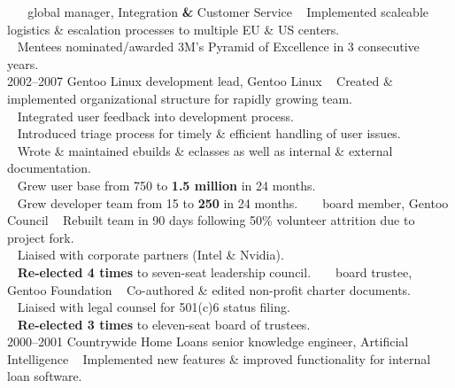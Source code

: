\documentclass[]{friggeri-cv} %
\begin{document}
\begin{entrylist}
\entry
{~}
{~}
{global manager, Integration \textbf{\&} Customer Service}
{{\tiny {}} ~ Implemented scaleable logistics \& escalation processes to multiple EU \& US centers.\\
{\tiny {}} ~ Mentees nominated/awarded 3M's Pyramid of Excellence in 3 consecutive years.\\}
\entry
{2002--2007}
{Gentoo Linux}
{development lead, Gentoo Linux}
{{\tiny {}} ~ Created \& implemented organizational structure for rapidly growing team.\\
{\tiny {}} ~ Integrated user feedback into development process.\\
{\tiny {}} ~ Introduced triage process for timely \& efficient handling of user issues.\\

{\tiny {}} ~ Wrote \& maintained ebuilds \& eclasses as well as internal \& external documentation.\\
{\tiny {}} ~ Grew user base from 750 to \textbf{1.5 million} in 24 months.\\
{\tiny {}} ~ Grew developer team from 15 to \textbf{250} in 24 months.}
\entry
{~}
{~}
{board member, Gentoo Council}
{{\tiny {}} ~ Rebuilt team in 90 days following 50\% volunteer attrition due to project fork.\\
{\tiny {}} ~ Liaised with corporate partners (Intel \& Nvidia).\\
{\tiny {}} ~ \textbf{Re-elected 4 times} to seven-seat leadership council. }
\entry
{~}
{~}
{board trustee, Gentoo Foundation}
{{\tiny {}} ~ Co-authored \& edited non-profit charter documents.\\
{\tiny {}} ~ Liaised with legal counsel for 501(c)6 status filing.\\
{\tiny {}} ~ \textbf{Re-elected 3 times} to eleven-seat board of trustees.\\}
\entry
{2000--2001}
{Countrywide Home Loans}
{senior knowledge engineer, Artificial Intelligence}
{{\tiny {}} ~ Implemented new features \& improved functionality for internal loan software.}
\end{entrylist}
\end{document}
